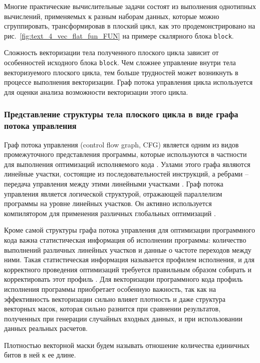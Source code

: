 Многие практические вычислительные задачи состоят из выполнения однотипных вычислений, применяемых к разным наборам данных, которые можно сгруппировать, трансформировав в плоский цикл, как это продемонстрировано на рис.~\ref{fig:text_4_vec_flat_fun_FUN} на примере скалярного блока \texttt{block}.

Сложность векторизации тела полученного плоского цикла зависит от особенностей исходного блока \texttt{block}.
Чем сложнее управление внутри тела векторизуемого плоского цикла, тем больше трудностей может возникнуть в процессе выполнения векторизации.
Граф потока управления цикла используется для оценки анализа возможности векторизации этого цикла.

\subsubsection{Представление структуры тела плоского цикла в виде графа потока управления}

Граф потока управления (control flow graph, CFG)\label{abbr:cfg-1} является одним из видов промежуточного представления программы, которые используются в частности для выполнения оптимизаций исполняемого кода \cite{Muchnick1997Compilers}.
Узлами этого графа являются линейные участки, состоящие из последовательностей инструкций, а ребрами -- передача управления между этими линейными участками \cite{Rybakov2013CGF}.
Граф потока управления является логической структурой, отражающей параллелизм программы на уровне линейных участков.
Он активно используется компилятором для применения различных глобальных оптимизаций \cite{Aho2006Compilers}.

Кроме самой структуры графа потока управления для оптимизации программного кода важна статистическая информация об исполнении программы: количество выполнений различных линейных участков и данные о частоте переходов между ними.
Такая статистическая информация называется профилем исполнения, и для корректного проведения оптимизаций требуется правильным образом собирать и корректировать этот профиль \cite{Chetverina2015Profile}.
Для векторизации программного кода профиль исполнения программы приобретает особенную важность, так как на эффективность векторизации сильно влияет плотность и даже структура векторных масок, которая сильно разнится при сравнении результатов, полученных при генерации случайных входных данных, и при использовании данных реальных расчетов.

\begin{definition}
Плотностью векторной маски будем называть отношение количества единичных битов в ней к ее длине.
\end{definition}

